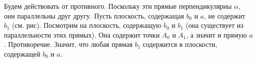 Будем действовать от противного. Поскольку эти прямые перпендикулярны $\alpha$, они параллельны друг другу. Пусть плоскость, содержащая $b_0$ и $a$, не содержит $b_1$ (см. рис). Посмотрим на плоскость, содержащую $b_0$ и $b_1$ (она существует из параллельности этих прямых). Она содержит точки $A_0$ и $A_1$, а значит и прямую $a$. Противоречие. Значит, что любая прямая $b_1$ содержится в плоскости, содержащей $b_0$ и $a$.